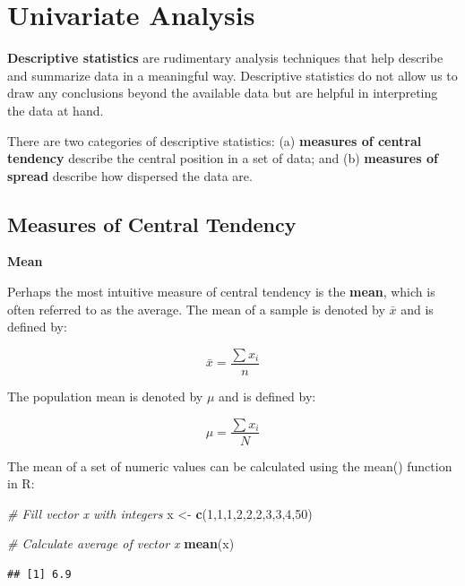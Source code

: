 \documentclass[]{book}
\newenvironment{Shaded}{\begin{snugshade}}{\end{snugshade}}
\newcommand{\CommentTok}[1]{\textcolor[rgb]{0.56,0.35,0.01}{\textit{#1}}}
\newcommand{\DecValTok}[1]{\textcolor[rgb]{0.00,0.00,0.81}{#1}}
\newcommand{\KeywordTok}[1]{\textcolor[rgb]{0.13,0.29,0.53}{\textbf{#1}}}
\newcommand{\NormalTok}[1]{#1}
\newcommand{\StringTok}[1]{\textcolor[rgb]{0.31,0.60,0.02}{#1}}
\begin{document}
\hypertarget{univariate-analysis}{%
\section{Univariate Analysis}\label{univariate-analysis}}

\textbf{Descriptive statistics} are rudimentary analysis techniques that help describe and summarize data in a meaningful way. Descriptive statistics do not allow us to draw any conclusions beyond the available data but are helpful in interpreting the data at hand.

There are two categories of descriptive statistics: (a) \textbf{measures of central tendency} describe the central position in a set of data; and (b) \textbf{measures of spread} describe how dispersed the data are.

\hypertarget{measures-of-central-tendency}{%
\subsection{Measures of Central Tendency}\label{measures-of-central-tendency}}

\textbf{Mean}

Perhaps the most intuitive measure of central tendency is the \textbf{mean}, which is often referred to as the average. The mean of a sample is denoted by \(\bar{x}\) and is defined by:

\[ \bar{x} = \frac{\sum x_{i}}{n} \]

The population mean is denoted by \(\mu\) and is defined by:

\[ \mu = \frac{\sum x_{i}}{N} \]

The mean of a set of numeric values can be calculated using the mean() function in R:

\begin{Shaded}
\begin{Highlighting}[]
\CommentTok{# Fill vector x with integers}
\NormalTok{x <-}\StringTok{ }\KeywordTok{c}\NormalTok{(}\DecValTok{1}\NormalTok{,}\DecValTok{1}\NormalTok{,}\DecValTok{1}\NormalTok{,}\DecValTok{2}\NormalTok{,}\DecValTok{2}\NormalTok{,}\DecValTok{2}\NormalTok{,}\DecValTok{3}\NormalTok{,}\DecValTok{3}\NormalTok{,}\DecValTok{4}\NormalTok{,}\DecValTok{50}\NormalTok{)}

\CommentTok{# Calculate average of vector x}
\KeywordTok{mean}\NormalTok{(x)}
\end{Highlighting}
\end{Shaded}

\begin{verbatim}
## [1] 6.9
\end{verbatim}
\end{document}
